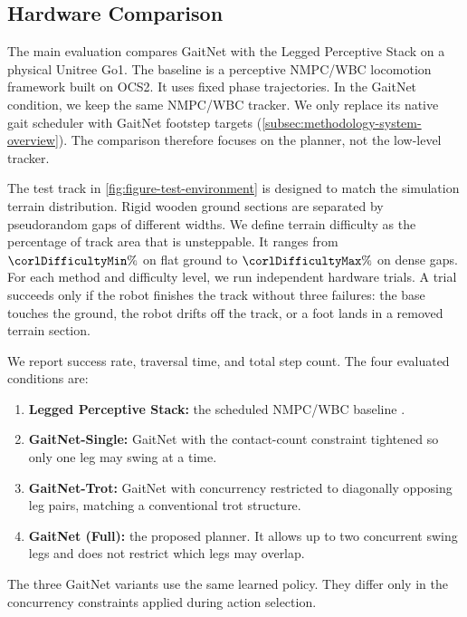 
\subsection{Hardware Comparison}
\label{subsec:results-hardware-comparison}

The main evaluation compares GaitNet with the Legged Perceptive Stack
\cite{leggedperceptive} on a physical Unitree Go1. The baseline is a
perceptive NMPC/WBC locomotion framework built on OCS2. It uses fixed
phase trajectories. In the GaitNet condition, we keep the same
NMPC/WBC tracker. We only replace its native gait scheduler with
GaitNet footstep targets
(\autoref{subsec:methodology-system-overview}). The comparison
therefore focuses on the planner, not the low-level tracker.

The test track in \autoref{fig:figure-test-environment} is designed
to match the simulation terrain distribution. Rigid wooden ground
sections are separated by pseudorandom gaps of different widths. We
define terrain difficulty as the percentage of track area that is
unsteppable. It ranges from $\corlDifficultyMin\%$ on flat ground to
$\corlDifficultyMax\%$ on dense gaps. For each method and difficulty
level, we run \corlHwTrialsPerCell{} independent hardware trials. A
trial succeeds only if the robot finishes the track without three
failures: the base touches the ground, the robot drifts off the track,
or a foot lands in a removed terrain section.

We report success rate, traversal time, and total step count. The four
evaluated conditions are:
\begin{enumerate}
  \item \textbf{Legged Perceptive Stack:} the scheduled NMPC/WBC
    baseline \cite{leggedperceptive}.
  \item \textbf{GaitNet-Single:} GaitNet with the contact-count
    constraint tightened so only one leg may swing at a time.
  \item \textbf{GaitNet-Trot:} GaitNet with concurrency restricted to
    diagonally opposing leg pairs, matching a conventional trot
    structure.
  \item \textbf{GaitNet (Full):} the proposed planner. It allows up to
    two concurrent swing legs and does not restrict which legs may
    overlap.
\end{enumerate}
The three GaitNet variants use the same learned policy. They differ
only in the concurrency constraints applied during action selection.

